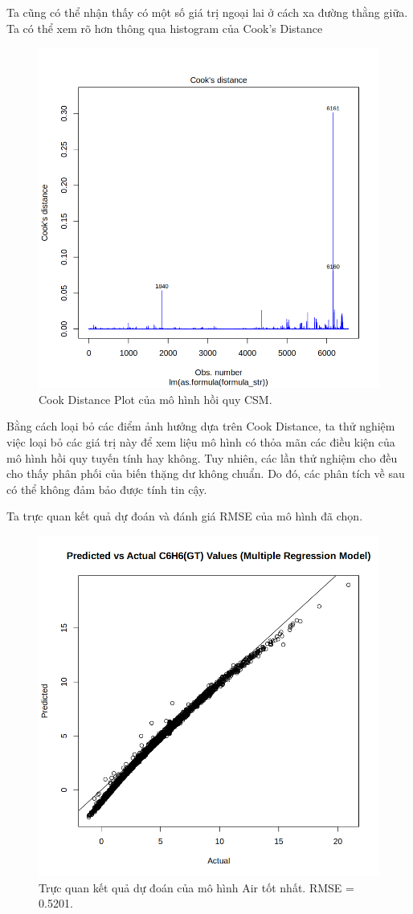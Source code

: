 Ta cũng có thể nhận thấy có một số giá trị ngoại lai ở cách xa đường thằng giữa. Ta có thể xem rõ hơn thông qua histogram của Cook's Distance
\begin{figure}[H]
    \centering
    \includegraphics[width=0.75\columnwidth]{air_figures/best_model_air_cook.png}
    \caption{Cook Distance Plot của mô hình hồi quy CSM.}
    \label{fig:best_model_air_cook}
\end{figure}

Bằng cách loại bỏ các điểm ảnh hưởng dựa trên Cook Distance, ta thử nghiệm việc loại bỏ các giá trị này để xem liệu mô hình có thỏa mãn các điều kiện của mô hình hồi quy tuyến tính hay không. Tuy nhiên, các lần thử nghiệm cho đều cho thấy phân phối của biến thặng dư không chuẩn. Do đó, các phân tích về sau có thể không đảm bảo được tính tin cậy.

Ta trực quan kết quả dự đoán và đánh giá RMSE của mô hình đã chọn.

\begin{figure}[H]
    \centering
    \includegraphics[width=0.75\columnwidth]{air_figures/best_model_air_prediction.png}
    \caption{Trực quan kết quả dự đoán của mô hình Air tốt nhất. RMSE = 0.5201.}
    \label{fig:best_model_air_predictiont}
\end{figure}

